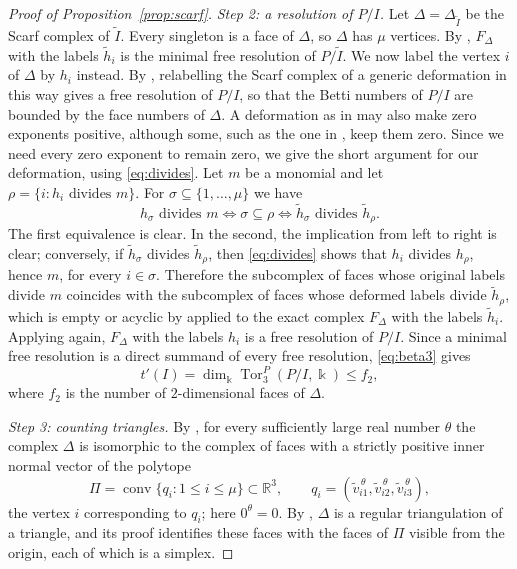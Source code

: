 \documentclass{amsart}
\theoremstyle{definition}
\theoremstyle{remark}
\numberwithin{equation}{section}
\newcommand{\R}{\mathbb{R}}
\newcommand{\kk}{\Bbbk}
\DeclareMathOperator{\Tor}{Tor}
\begin{document}
\begin{proof}[Proof of Proposition~\textup{\ref{prop:scarf}}]
\emph{Step 2: a resolution of $P/I$.} Let $\Delta=\Delta_{\tilde I}$ be the Scarf complex of $\tilde I$. Every singleton is a face of $\Delta$, so $\Delta$ has $\mu$ vertices. By \cite[Theorem~3.2]{BPS98}, $F_\Delta$ with the labels $\tilde h_i$ is the minimal free resolution of $P/\tilde I$. We now label the vertex $i$ of $\Delta$ by $h_i$ instead. By \cite[Theorem~4.3 and Corollary~4.4]{BPS98}, relabelling the Scarf complex of a generic deformation in this way gives a free resolution of $P/I$, so that the Betti numbers of $P/I$ are bounded by the face numbers of $\Delta$. A deformation as in \cite[Construction~4.1]{BPS98} may also make zero exponents positive, although some, such as the one in \cite[Example~4.5]{BPS98}, keep them zero. Since we need every zero exponent to remain zero, we give the short argument for our deformation, using \eqref{eq:divides}. Let $m$ be a monomial and let $\rho=\{i : h_i \text{ divides } m\}$. For $\sigma\subseteq\{1,\dots,\mu\}$ we have
\[
h_\sigma \text{ divides } m\iff\sigma\subseteq\rho\iff\tilde h_\sigma \text{ divides } \tilde h_\rho .
\]
The first equivalence is clear. In the second, the implication from left to right is clear; conversely, if $\tilde h_\sigma$ divides $\tilde h_\rho$, then \eqref{eq:divides} shows that $h_i$ divides $h_\rho$, hence $m$, for every $i\in\sigma$. Therefore the subcomplex of faces whose original labels divide $m$ coincides with the subcomplex of faces whose deformed labels divide $\tilde h_\rho$, which is empty or acyclic by \cite[Lemma~2.2]{BPS98} applied to the exact complex $F_\Delta$ with the labels $\tilde h_i$. Applying \cite[Lemma~2.2]{BPS98} again, $F_\Delta$ with the labels $h_i$ is a free resolution of $P/I$. Since a minimal free resolution is a direct summand of every free resolution, \eqref{eq:beta3} gives
\[
t'(I)=\dim_\kk\Tor_3^P(P/I,\kk)\le f_2,
\]
where $f_2$ is the number of $2$-dimensional faces of $\Delta$.

\emph{Step 3: counting triangles.} By \cite[Proposition~5.3 and Construction~5.4]{BPS98}, for every sufficiently large real number $\theta$ the complex $\Delta$ is isomorphic to the complex of faces with a strictly positive inner normal vector of the polytope
\[
\Pi=\operatorname{conv}\{q_i : 1\le i\le\mu\}\subset\R^3,\qquad q_i=(\tilde v_{i1}^{\,\theta},\tilde v_{i2}^{\,\theta},\tilde v_{i3}^{\,\theta}),
\]
the vertex $i$ corresponding to $q_i$; here $0^\theta=0$. By \cite[Corollary~5.5]{BPS98}, $\Delta$ is a regular triangulation of a triangle, and its proof identifies these faces with the faces of $\Pi$ visible from the origin, each of which is a simplex.


\end{proof}
\end{document}
